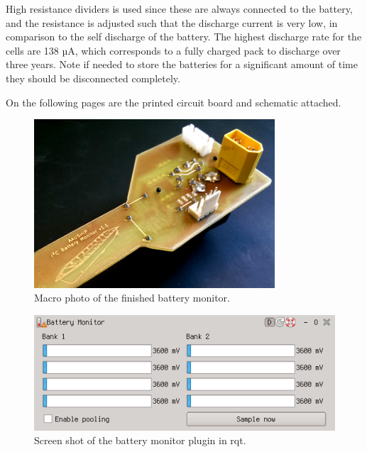 High resistance dividers is used since these are always connected to
the battery, and the resistance is adjusted such that the discharge
current is very low, in comparison to the self discharge of the
battery. The highest discharge rate for the cells are 138 µA, which
corresponds to a fully charged pack to discharge over three years.
Note if needed to store the batteries for a significant amount of
time they should be disconnected completely.

On the following pages are the printed circuit board and schematic attached.

\begin{figure}[H]
	\centering
	\includegraphics[width=0.8\textwidth]{fig/bm-macro}
	\caption{Macro photo of the finished battery monitor.}
	\label{fig:bm-macro}
\end{figure}

\begin{figure}[H]
	\centering
	\includegraphics[width=\textwidth]{fig/bm-rqt}
	\caption{Screen shot of the battery monitor plugin in rqt.}
	\label{fig:bm-rqt}
\end{figure}



